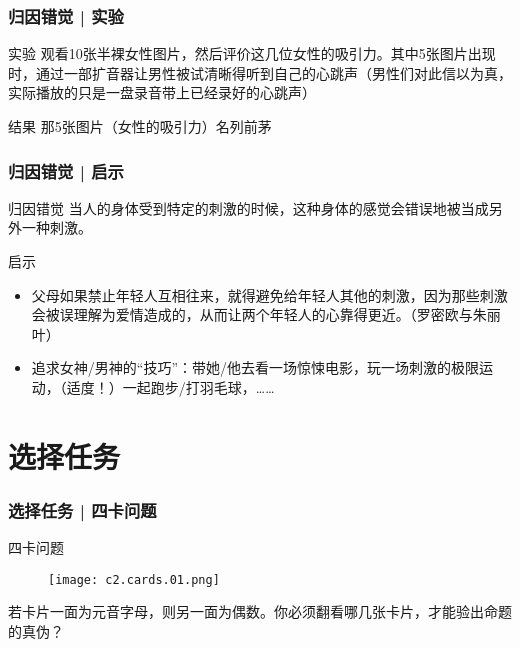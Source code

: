 \begin{frame}
  \frametitle{归因错觉 | 实验}
  \begin{block}{实验}
观看10张半裸女性图片，然后评价这几位女性的吸引力。其中5张图片出现时，通过一部扩音器让男性被试清晰得听到自己的心跳声（男性们对此信以为真，实际播放的只是一盘录音带上已经录好的心跳声）
  \end{block}
  \pause
  \begin{block}{结果}
    那5张图片（女性的吸引力）名列前茅
  \end{block}
\end{frame}

\begin{frame}
  \frametitle{归因错觉 | \alert{启示}}
  \begin{block}{归因错觉}
    当人的身体受到特定的刺激的时候，这种身体的感觉会错误地被当成另外一种刺激。
  \end{block}
  \pause
  \begin{block}{启示}
    \begin{itemize}
      \item 父母如果禁止年轻人互相往来，就得避免给年轻人其他的刺激，因为那些刺激会被误理解为爱情造成的，从而让两个年轻人的心靠得更近。（罗密欧与朱丽叶）
      \item 追求女神/男神的“技巧”：带她/他去看一场惊悚电影，玩一场刺激的极限运动，（适度！）一起跑步/打羽毛球，……
    \end{itemize}
  \end{block}
\end{frame}

\section{选择任务}
\begin{frame}
  \frametitle{选择任务 | 四卡问题}
  \begin{block}{四卡问题}
    \begin{figure}
      \centering
      \texttt{[image: c2.cards.01.png]}
    \end{figure}
    若卡片一面为元音字母，则另一面为偶数。你必须翻看哪几张卡片，才能验出命题的真伪？
  \end{block}
\end{frame}

